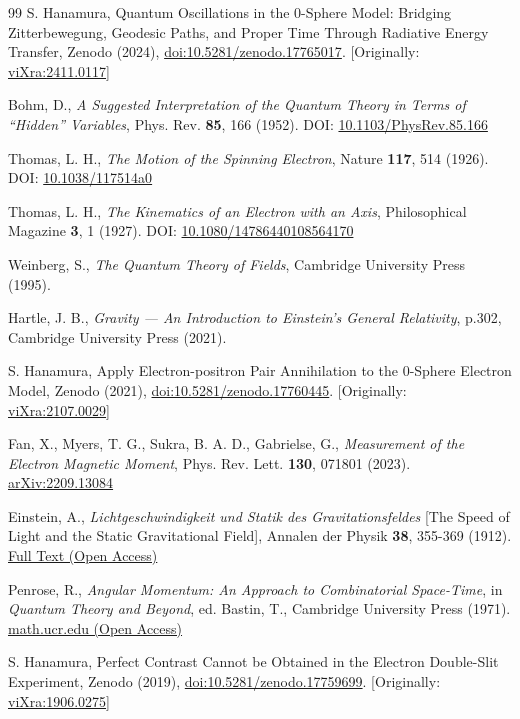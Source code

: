\documentclass[12pt,letterpaper]{article} %
\begin{document}
\begin{thebibliography}{99}
S. Hanamura, Quantum Oscillations in the 0-Sphere Model: Bridging Zitterbewegung, Geodesic Paths, and Proper Time Through Radiative Energy Transfer, Zenodo (2024), \href{https://doi.org/10.5281/zenodo.17765017}{doi:10.5281/zenodo.17765017}. [Originally: \href{https://vixra.org/abs/2411.0117}{viXra:2411.0117}]

Bohm, D., 
\textit{A Suggested Interpretation of the Quantum Theory in Terms of ``Hidden'' Variables}, 
Phys. Rev. \textbf{85}, 166 (1952). 
DOI: \href{https://doi.org/10.1103/PhysRev.85.166}{10.1103/PhysRev.85.166}

Thomas, L. H., 
\textit{The Motion of the Spinning Electron}, 
Nature \textbf{117}, 514 (1926). 
DOI: \href{https://doi.org/10.1038/117514a0}{10.1038/117514a0}

Thomas, L. H., 
\textit{The Kinematics of an Electron with an Axis}, 
Philosophical Magazine \textbf{3}, 1 (1927). 
DOI: \href{https://doi.org/10.1080/14786440108564170}{10.1080/14786440108564170}

Weinberg, S., 
\textit{The Quantum Theory of Fields}, Cambridge University Press (1995).

Hartle, J. B., 
\textit{Gravity --- An Introduction to Einstein's General Relativity}, p.302, Cambridge University Press (2021).

S. Hanamura, Apply Electron-positron Pair Annihilation to the 0-Sphere Electron Model, Zenodo (2021), \href{https://doi.org/10.5281/zenodo.17760445}{doi:10.5281/zenodo.17760445}. [Originally: \href{https://vixra.org/abs/2107.0029}{viXra:2107.0029}]

Fan, X., Myers, T. G., Sukra, B. A. D., Gabrielse, G., 
\textit{Measurement of the Electron Magnetic Moment}, 
Phys. Rev. Lett. \textbf{130}, 071801 (2023). 
\href{https://arxiv.org/abs/2209.13084}{arXiv:2209.13084}

Einstein, A.,
\textit{Lichtgeschwindigkeit und Statik des Gravitationsfeldes} [The Speed of Light and the Static Gravitational Field],
Annalen der Physik \textbf{38}, 355-369 (1912). 
\href{http://myweb.rz.uni-augsburg.de/~eckern/adp/history/einstein-papers/1912_38_355-369.pdf}{Full Text (Open Access)}

Penrose, R., 
\textit{Angular Momentum: An Approach to Combinatorial Space-Time}, 
in \textit{Quantum Theory and Beyond}, ed. Bastin, T., Cambridge University Press (1971).
\href{https://math.ucr.edu/home/baez/penrose/Penrose-AngularMomentum.pdf}{math.ucr.edu (Open Access)}

S. Hanamura, Perfect Contrast Cannot be Obtained in the Electron Double-Slit Experiment, Zenodo (2019), \href{https://doi.org/10.5281/zenodo.17759699}{doi:10.5281/zenodo.17759699}. [Originally: \href{https://vixra.org/abs/1906.0275}{viXra:1906.0275}]

\end{thebibliography}
\end{document}
